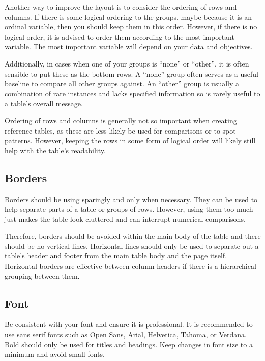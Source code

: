 \documentclass[
]{book}
\begin{document}
Another way to improve the layout is to consider the ordering of rows and columns. If there is some logical ordering to the groups, maybe because it is an ordinal variable, then you should keep them in this order. However, if there is no logical order, it is advised to order them according to the most important variable. The most important variable will depend on your data and objectives.

Additionally, in cases when one of your groups is ``none'' or ``other'', it is often sensible to put these as the bottom rows. A ``none'' group often serves as a useful baseline to compare all other groups against. An ``other'' group is usually a combination of rare instances and lacks specified information so is rarely useful to a table's overall message.

Ordering of rows and columns is generally not so important when creating reference tables, as these are less likely be used for comparisons or to spot patterns. However, keeping the rows in some form of logical order will likely still help with the table's readability.

\hypertarget{borders}{%
\subsection{Borders}\label{borders}}

Borders should be using sparingly and only when necessary. They can be used to help separate parts of a table or groups of rows. However, using them too much just makes the table look cluttered and can interrupt numerical comparisons.

Therefore, borders should be avoided within the main body of the table and there should be no vertical lines. Horizontal lines should only be used to separate out a table's header and footer from the main table body and the page itself. Horizontal borders are effective between column headers if there is a hierarchical grouping between them.

\hypertarget{font}{%
\subsection{Font}\label{font}}

Be consistent with your font and ensure it is professional. It is recommended to use sans serif fonts such as Open Sans, Arial, Helvetica, Tahoma, or Verdana. Bold should only be used for titles and headings. Keep changes in font size to a minimum and avoid small fonts.
\end{document}
